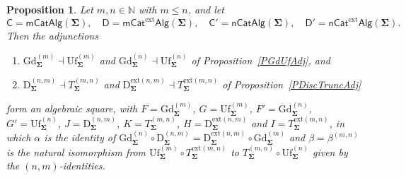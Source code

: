 \documentclass{amsart}
\theoremstyle{plain}
\newtheorem{proposition}[theorem]{Proposition}
\theoremstyle{definition}
\begin{document}
\begin{proposition}\label{PAlgSquareFinite}
Let $m,n\in\mathbb{N}$ with $m\leq n$, and let
$$
\mathsf{C}=\mathsf{mCatAlg}(\mathbf{\Sigma}),\quad
\mathsf{D}=\mathsf{mCat}^{\mathrm{ext}}\mathsf{Alg}(\mathbf{\Sigma}),\quad
\mathsf{C}'=\mathsf{nCatAlg}(\mathbf{\Sigma}),\quad
\mathsf{D}'=\mathsf{nCat}^{\mathrm{ext}}\mathsf{Alg}(\mathbf{\Sigma}).
$$
Then the adjunctions
\begin{enumerate}
\item $\mathrm{Gd}^{(m)}_{\mathbf{\Sigma}}\dashv\mathrm{Uf}^{(m)}_{\mathbf{\Sigma}}$ and $\mathrm{Gd}^{(n)}_{\mathbf{\Sigma}}\dashv\mathrm{Uf}^{(n)}_{\mathbf{\Sigma}}$ of Proposition~\ref{PGdUfAdj}, and
\item $\mathrm{D}^{(n,m)}_{\mathbf{\Sigma}}\dashv T^{(m,n)}_{\mathbf{\Sigma}}$ and $\mathrm{D}^{\mathrm{ext}(n,m)}_{\mathbf{\Sigma}}\dashv T^{\mathrm{ext}(m,n)}_{\mathbf{\Sigma}}$ of Proposition~\ref{PDiscTruncAdj}
\end{enumerate}
form an algebraic square, with $F=\mathrm{Gd}^{(m)}_{\mathbf{\Sigma}}$, $G=\mathrm{Uf}^{(m)}_{\mathbf{\Sigma}}$, $F'=\mathrm{Gd}^{(n)}_{\mathbf{\Sigma}}$, $G'=\mathrm{Uf}^{(n)}_{\mathbf{\Sigma}}$, $J=\mathrm{D}^{(n,m)}_{\mathbf{\Sigma}}$, $K=T^{(m,n)}_{\mathbf{\Sigma}}$, $H=\mathrm{D}^{\mathrm{ext}(n,m)}_{\mathbf{\Sigma}}$ and $I=T^{\mathrm{ext}(m,n)}_{\mathbf{\Sigma}}$, in which $\alpha$ is the identity of $\mathrm{Gd}^{(n)}_{\mathbf{\Sigma}}\circ\mathrm{D}^{(n,m)}_{\mathbf{\Sigma}}=\mathrm{D}^{\mathrm{ext}(n,m)}_{\mathbf{\Sigma}}\circ\mathrm{Gd}^{(m)}_{\mathbf{\Sigma}}$ and $\beta=\beta^{(m,n)}$ is the natural isomorphism from $\mathrm{Uf}^{(m)}_{\mathbf{\Sigma}}\circ T^{\mathrm{ext}(m,n)}_{\mathbf{\Sigma}}$ to $T^{(m,n)}_{\mathbf{\Sigma}}\circ\mathrm{Uf}^{(n)}_{\mathbf{\Sigma}}$ given by the $(n,m)$-identities.
\begin{center}
\end{center}
\end{proposition}
\end{document}
